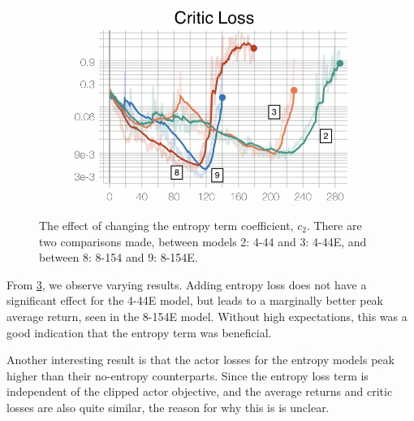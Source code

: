 \begin{figure}[hbt]
\begin{subfigure}[b]{0.32\textwidth}
         \caption{}
         \label{fig:5_training_ppo_entcoefActorL}
     \end{subfigure}
     \hfill
     \begin{subfigure}[b]{0.32\textwidth}
         \centering
         \includegraphics[width=\textwidth]{figures/5_/Training/ppo_entcoefCriticL.png}
         \caption{}
         \label{fig:5_training_ppo_entcoefCriticL}
     \end{subfigure}
    \captionsetup{justification=centering}
    \caption{The effect of changing the entropy term coefficient, $c_2$. There are two comparisons made, between models 2: 4-44 and 3: 4-44E, and between 8: 8-154 and 9: 8-154E.}
     \label{fig:5_training_ppo_entcoef}
\end{figure}
From \cref{fig:5_training_ppo_entcoef}, we observe varying results. Adding entropy loss does not have a significant effect for the 4-44E model, but leads to a marginally better peak average return, seen in the 8-154E model. Without high expectations, this was a good indication that the entropy term was beneficial.

Another interesting result is that the actor losses for the entropy models peak higher than their no-entropy counterparts. Since the entropy loss term is independent of the clipped actor objective, and the average returns and critic losses are also quite similar, the reason for why this is is unclear.


